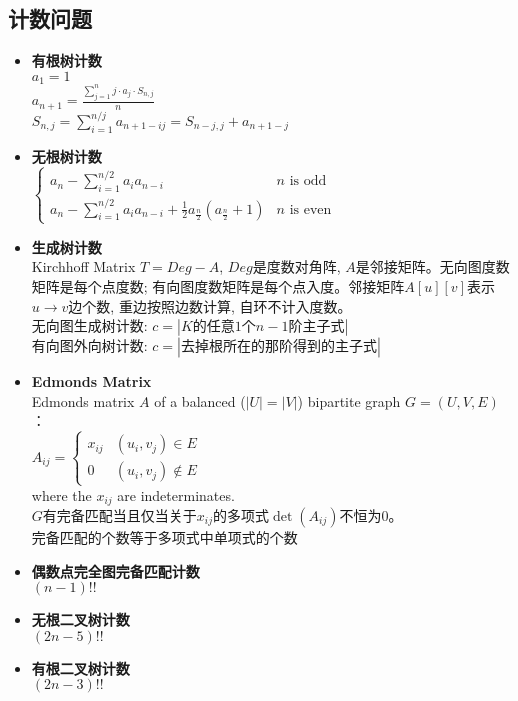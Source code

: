 	\subsection*{计数问题}
		\begin{itemize}[nosep,wide=0pt]
			\item \textbf{有根树计数}
				\\$ a_1 = 1 $
				\\$ a_{n + 1} = \frac{\sum\limits_{j = 1}^{n} j \cdot a_j \cdot S_{n, j}}{n} $
				\\$ S_{n, j} = \sum\limits_{i = 1}^{n / j} a_{n + 1 - ij} = S_{n - j, j} + a_{n + 1 - j} $
			\item \textbf{无根树计数}
				\\$ \begin{cases}
					a_n - \sum\limits_{i = 1}^{n / 2} a_i a_{n - i} & n \text{ is odd}\\
					a_n - \sum\limits_{i = 1}^{n / 2} a_i a_{n - i} + \frac{1}{2} a_{\frac{n}{2}} (a_{\frac{n}{2}} + 1) & n \text{ is even}
				\end{cases} $
			\item \textbf{生成树计数}
				\\Kirchhoff Matrix $ T = Deg − A $, $ Deg $是度数对角阵, $ A $是邻接矩阵。无向图度数矩阵是每个点度数; 有向图度数矩阵是每个点入度。邻接矩阵$ A[u][v] $表示$ u \to v $边个数, 重边按照边数计算, 自环不计入度数。
				\\无向图生成树计数: $ c = \left|K\text{的任意}1\text{个}n−1\text{阶主子式}\right| $
				\\有向图外向树计数: $ c = \left|\text{去掉根所在的那阶得到的主子式}\right| $
			\item \textbf{Edmonds Matrix}
				\\Edmonds matrix $ A $ of a balanced ($ \left| U \right| = \left| V \right| $) bipartite graph $ G = (U, V, E) $：
				\\$ A_{ij} = \begin{cases}
					x_{ij} & (u_i, v_j) \in E\\
					0 & (u_i, v_j) \notin E
				\end{cases} $
				\\where the $ x_{ij} $ are indeterminates.
				\\$ G $有完备匹配当且仅当关于$ x_{ij} $的多项式$ \det(A_{ij}) $不恒为$ 0 $。
				\\完备匹配的个数等于多项式中单项式的个数
			\item \textbf{偶数点完全图完备匹配计数}
				\\$ (n - 1)!! $
			\item \textbf{无根二叉树计数}
				\\$ (2n - 5)!! $
			\item \textbf{有根二叉树计数}
				\\$ (2n - 3)!! $
		\end{itemize}
